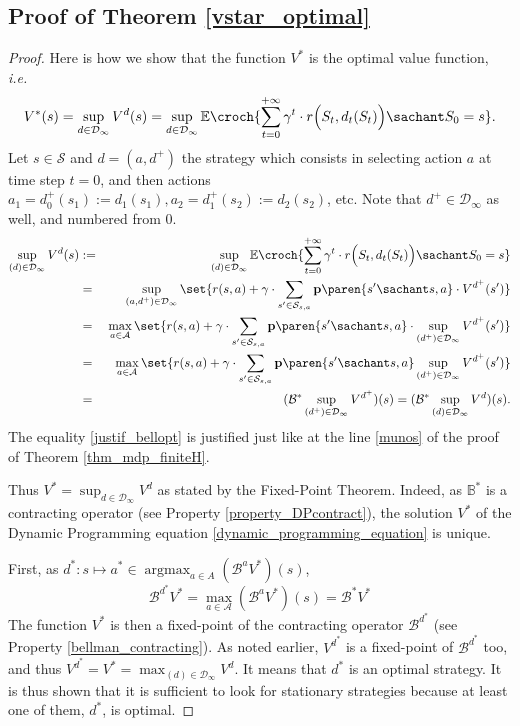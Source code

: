 \subsection{Proof of Theorem \ref{vstar_optimal}}
\label{vstar_optimal_RETURN}
\begin{proof}
Here is how we show that the function $V^*$ is the optimal value function, 
\textit{i.e.} 
\[ V^*(s) = \sup_{d \in \mathcal{D}_{\infty}} V^d(s) =\sup_{d \in \mathcal{D}_{\infty}} \mathbb{E} \croch{\sum_{t=0}^{+ \infty} \gamma^t \cdot r\Big(S_t,d_t(S_t)\Big) \sachant S_0=s }. \]
Let $s \in \mathcal{S}$ and $d=(a,d^+)$ 
the strategy which consists in selecting action $a$ 
at time step $t=0$, 
and then actions $a_1=d^+_0(s_1):=d_1(s_1),a_2=d^+_1(s_2) := d_2(s_2)$, etc. 
Note that $d^+ \in \mathcal{D}_{\infty}$ as well,
and numbered from $0$. 
\begin{eqnarray}
\nonumber \sup_{(d) \in \mathcal{D}_{\infty}} V^d(s) & := & \sup_{(d) \in \mathcal{D}_{\infty}} \mathbb{E} \croch{\sum_{t=0}^{+ \infty} \gamma^t \cdot r\Big(S_t,d_t(S_t)\Big) \sachant S_0=s } \\
\nonumber & = & \sup_{(a,d^+) \in \mathcal{D}_{\infty}} \set{ r(s,a) + \gamma \cdot \sum_{s' \in \mathcal{S}_{s,a}} \textbf{p} \paren{s' \sachant s,a} \cdot V^{d^+}(s')} \\
\label{justif_bellopt} & = & \max_{a \in \mathcal{A}} \set{ r(s,a) + \gamma \cdot \sum_{s' \in \mathcal{S}_{s,a}} \textbf{p} \paren{s' \sachant s,a} \cdot \sup_{(d^+) \in \mathcal{D}_{\infty}} V^{d^+}(s')}  \\
\nonumber & = & \max_{a \in \mathcal{A}} \set{ r(s,a) + \gamma \cdot \sum_{s' \in \mathcal{S}_{s,a}} \textbf{p} \paren{s' \sachant s,a} \sup_{(d^+) \in \mathcal{D}_{\infty}} V^{d^+}(s')} \\
\nonumber & = & (\mathcal{B}^* \sup_{(d^+) \in \mathcal{D}_{\infty}} V^{d^+})(s) = (\mathcal{B}^* \sup_{(d) \in \mathcal{D}_{\infty}} V^{d})(s) .
\end{eqnarray}
The equality \ref{justif_bellopt} is justified
just like at the line \ref{munos} of the proof of Theorem \ref{thm_mdp_finiteH}.

Thus $V^*= \sup_{d \in \mathcal{D}_{\infty}} V^d$ 
as stated by the Fixed-Point Theorem.
Indeed, as $\mathbb{B}^*$ is a contracting operator (see Property \ref{property_DPcontract}), 
the solution $V^*$ of the Dynamic Programming equation \ref{dynamic_programming_equation} is unique. 

First, as $d^*:  s \mapsto a^* \in \operatorname*{argmax}_{a \in A}(\mathcal{B}^a V^*)(s)$,
\[ \mathcal{B}^{d^*} V^{*} = \max_{a \in \mathcal{A}} (\mathcal{B}^a V^*)(s) = \mathcal{B}^* V^*\]
The function $V^*$ is then a fixed-point of the contracting operator $\mathcal{B}^{d^*}$
(see Property \ref{bellman_contracting}).
As noted earlier, $V^{d^*}$ is a fixed-point of $\mathcal{B}^{d^*}$ too, 
and thus $V^{d^*} = V^* = \max_{(d) \in \mathcal{D}_{\infty}} V^d$. 
It means that $d^*$ is an optimal strategy.
It is thus shown that
it is sufficient to look for 
stationary strategies
because at least one of them,
$d^*$, is optimal.
\end{proof}








